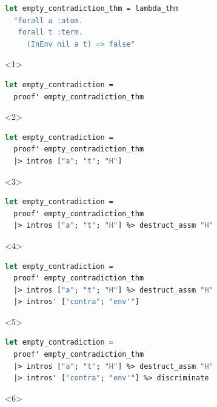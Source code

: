 \documentclass[aspectratio=169]{beamer}
\begin{document}
\begin{frame}[fragile]
\begin{lstlisting}[mathescape,language=OCaml,escapebegin=\color{codepurple}]
let empty_contradiction_thm = lambda_thm
  "forall a :atom.
   forall t :term.
     (InEnv nil a t) => false"
\end{lstlisting}

\begin{overlayarea}{\linewidth}{3cm}
\begin{onlyenv}<1>
\begin{lstlisting}[mathescape,language=OCaml,escapebegin=\color{codepurple}]
  let empty_contradiction =
  proof' empty_contradiction_thm
\end{lstlisting}
\end{onlyenv}
  \begin{onlyenv}<2>
  \begin{lstlisting}[mathescape,language=OCaml,escapebegin=\color{codepurple}]
  let empty_contradiction =
  proof' empty_contradiction_thm
  |> intros ["a"; "t"; "H"]
\end{lstlisting}
\end{onlyenv}
  \begin{onlyenv}<3>
  \begin{lstlisting}[mathescape,language=OCaml,escapebegin=\color{codepurple}]
  let empty_contradiction =
  proof' empty_contradiction_thm
  |> intros ["a"; "t"; "H"] %> destruct_assm "H"
\end{lstlisting}
\end{onlyenv}
  \begin{onlyenv}<4>
  \begin{lstlisting}[mathescape,language=OCaml,escapebegin=\color{codepurple}]
  let empty_contradiction =
  proof' empty_contradiction_thm
  |> intros ["a"; "t"; "H"] %> destruct_assm "H"
  |> intros' ["contra"; "env'"]
\end{lstlisting}
\end{onlyenv}
  \begin{onlyenv}<5>
  \begin{lstlisting}[mathescape,language=OCaml,escapebegin=\color{codepurple}]
  let empty_contradiction =
  proof' empty_contradiction_thm
  |> intros ["a"; "t"; "H"] %> destruct_assm "H"
  |> intros' ["contra"; "env'"] %> discriminate
\end{lstlisting}
\end{onlyenv}
  \begin{onlyenv}<6>
  \begin{lstlisting}[mathescape,language=OCaml,escapebegin=\color{codepurple}]

\end{lstlisting}
\end{onlyenv}
\end{overlayarea}
\end{frame}
\end{document}
